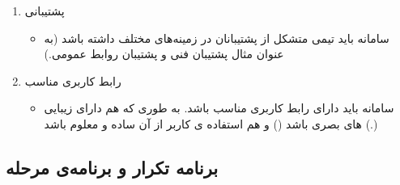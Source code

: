 \documentclass{report}
\begin{document}
\begin{enumerate}
					\item پشتیبانی
						\begin{itemize}
							\item 
							سامانه باید تیمی متشکل از پشتیبانان در زمینه‌های مختلف داشته باشد (به عنوان مثال پشتیبان فنی و پشتیبان روابط عمومی.)
						\end{itemize}
					
					\item رابط کاربری مناسب
						\begin{itemize}
							\item 
							سامانه باید دارای رابط کاربری مناسب باشد. به طوری که هم دارای زیبایی های بصری باشد () و هم استفاده ی کاربر از آن ساده و معلوم باشد (.)
						\end{itemize}					
				\end{enumerate}
			\subsection{برنامه تکرار و برنامه‌ی مرحله}
			



\end{document}
